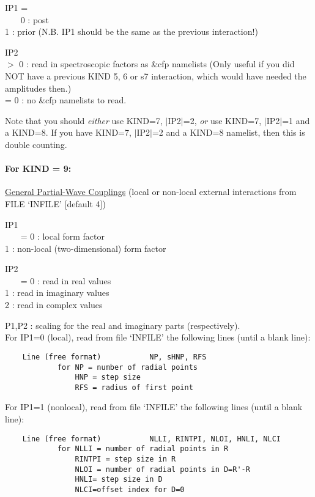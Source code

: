 \documentclass[11pt]{article}
\begin{document}
\begin{description}
 IP1 = \\
~~~  0 : post
\\  1 : prior
 (N.B. IP1 should be the same as the previous interaction!)



IP2
\\  $>$ 0 : read in spectroscopic factors as \&cfp namelists
 (Only useful if you did NOT have a previous KIND 5, 6 or s7
interaction, which would have needed the amplitudes then.)
\\  = 0 : no \&cfp namelists to read.


Note that you should {\em either} use KIND=7, $|$IP2$|$=2,
{\em or} use  KIND=7, $|$IP2$|$=1  and a KIND=8.
If you have KIND=7, $|$IP2$|$=2 and a KIND=8 namelist, then this is
double counting.
\bigskip


\paragraph{For KIND = 9:} 
\underline{General Partial-Wave Couplings}
(local or non-local external interactions from FILE `INFILE' [default 4])

IP1 \\
~~~  = 0 : local form factor
\\   1 : non-local (two-dimensional) form factor

IP2\\
~~~  = 0 : read in real values   
\\   1 : read in imaginary values   
\\   2 : read in complex values       

 P1,P2 : scaling for the real and imaginary parts (respectively).\\

For IP1=0 (local), read from file `INFILE' the following lines
   (until a blank line):
\begin{verbatim}
    Line (free format)           NP, sHNP, RFS
            for NP = number of radial points
                HNP = step size
                RFS = radius of first point
\end{verbatim}
For IP1=1 (nonlocal), read from file `INFILE' the following lines    (until a blank line):
\begin{verbatim}
    Line (free format)           NLLI, RINTPI, NLOI, HNLI, NLCI
            for NLLI = number of radial points in R
                RINTPI = step size in R
                NLOI = number of radial points in D=R'-R
                HNLI= step size in D
                NLCI=offset index for D=0
\end{verbatim}


\end{description}
\end{document}
